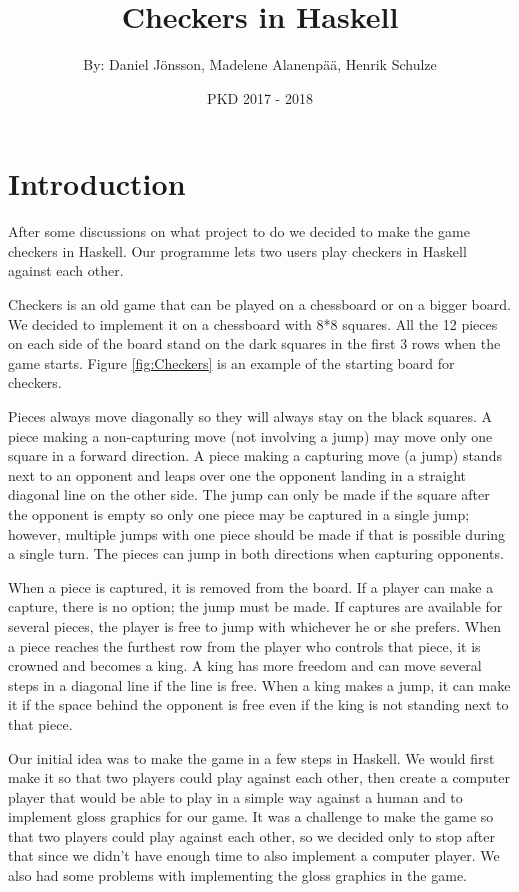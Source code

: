 \documentclass[12pt,a4paper]{article}
\title{Checkers in Haskell}
\author{By: Daniel Jönsson, Madelene Alanenpää, Henrik Schulze }
\date{PKD 2017 - 2018}
\begin{document}
\maketitle
\newpage
\tableofcontents
\newpage

\section{Introduction}
After some discussions on what project to do we decided to make the game checkers in Haskell. Our programme lets two users play checkers in Haskell against each other. 

Checkers is an old game that can be played on a chessboard or on a bigger board. We decided to implement it on a chessboard with 8*8 squares. All the 12 pieces on each side of the board stand on the dark squares in the first 3 rows when the game starts. Figure \ref{fig:Checkers} is an example of the starting board for checkers.

Pieces always move diagonally so they will always stay on the black squares. A piece making a non-capturing move (not involving a jump) may move only one square in a forward direction. A piece making a capturing move (a jump) stands next to an opponent and leaps over one the opponent landing in a straight diagonal line on the other side. The jump can only be made if the square after the opponent is empty so only one piece may be captured in a single jump; however, multiple jumps with one piece should be made if that is possible during a single turn. The pieces can jump in both directions when capturing opponents.

When a piece is captured, it is removed from the board. If a player can make a capture, there is no option; the jump must be made. If captures are available for several pieces, the player is free to jump with whichever he or she prefers. When a piece reaches the furthest row from the player who controls that piece, it is crowned and becomes a king. A king has more freedom and can move several steps in a diagonal line if the line is free. When a king makes a jump, it can make it if the space behind the opponent is free even if the king is not standing next to that piece.

Our initial idea was to make the game in a few steps in Haskell. We would first make it so that two players could play against each other, then create a computer player that would be able to play in a simple way against a human and to implement gloss graphics for our game. It was a challenge to make the game so that two players could play against each other, so we decided only to stop after that since we didn’t have enough time to also implement a computer player. We also had some problems with implementing the gloss graphics in the game.
\end{document}
